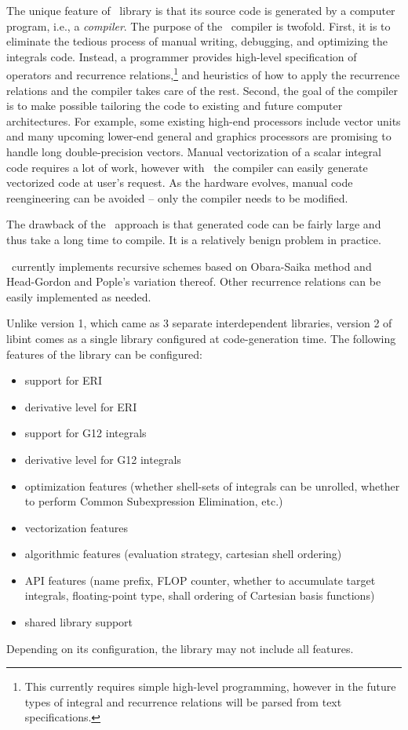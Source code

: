 \documentclass[12pt]{article}
\begin{document}
The unique feature of \LIBINT\ library is that its source code is generated by a computer program, i.e., a {\em compiler}.
The purpose of the \LIBINT\ compiler is twofold.
First, it is to eliminate the tedious process of manual writing, debugging,
and optimizing the integrals code.
Instead, a programmer provides high-level specification of
operators and recurrence relations,\footnote{This currently
requires simple high-level programming, however in the future types of integral and recurrence relations
will be parsed from text specifications.}
and heuristics of how to apply the recurrence relations and the compiler takes care of the rest.
Second, the goal of the compiler is to make possible tailoring the code to existing
and future computer architectures. For example, some existing high-end processors
include vector units and many upcoming lower-end general and graphics processors
are promising to handle long double-precision vectors. Manual vectorization of a scalar integral code requires a lot of work,
however with \LIBINT\ the compiler can easily generate vectorized code at user's request. As the hardware
evolves, manual code reengineering can be avoided -- only the compiler needs to be modified.

The drawback of the \LIBINT\ approach is that generated code can be fairly large and thus take a long time to compile.
It is a relatively benign problem in practice.

\LIBINT\ currently implements recursive schemes based on Obara-Saika method\cite{Obara86} and Head-Gordon and Pople's
variation thereof.\cite{Head-Gordon88} Other recurrence relations can be easily implemented as needed.

Unlike version 1, which came as 3 separate interdependent libraries, version 2 of libint
comes as a single library configured at code-generation time.
The following features of the library can be configured:
\begin{itemize}
\item support for ERI
\item derivative level for ERI
\item support for G12 integrals
\item derivative level for G12 integrals
\item optimization features (whether shell-sets of integrals can be unrolled,
whether to perform Common Subexpression Elimination, etc.)
\item vectorization features
\item algorithmic features (evaluation strategy, cartesian shell ordering)
\item API features (name prefix, FLOP counter, whether to accumulate target integrals, floating-point type,
shall ordering of Cartesian basis functions)
\item shared library support
\end{itemize}
Depending on its configuration, the library may not include all features.
\end{document}
